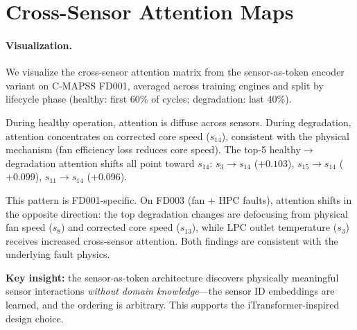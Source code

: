 \documentclass{article}
\begin{document}
\section{Cross-Sensor Attention Maps}
\label{app:attention_maps}

\paragraph{Visualization.} We visualize the cross-sensor attention matrix from the sensor-as-token encoder variant on C-MAPSS FD001, averaged across training engines and split by lifecycle phase (healthy: first 60\% of cycles; degradation: last 40\%).

During healthy operation, attention is diffuse across sensors. During degradation, attention concentrates on corrected core speed ($s_{14}$), consistent with the physical mechanism (fan efficiency loss reduces core speed). The top-5 healthy$\to$degradation attention shifts all point toward $s_{14}$: $s_3 \to s_{14}$ ($+0.103$), $s_{15} \to s_{14}$ ($+0.099$), $s_{11} \to s_{14}$ ($+0.096$).

This pattern is FD001-specific. On FD003 (fan + HPC faults), attention shifts in the opposite direction: the top degradation changes are defocusing from physical fan speed ($s_8$) and corrected core speed ($s_{13}$), while LPC outlet temperature ($s_3$) receives increased cross-sensor attention. Both findings are consistent with the underlying fault physics.

\textbf{Key insight:} the sensor-as-token architecture discovers physically meaningful sensor interactions \emph{without domain knowledge}---the sensor ID embeddings are learned, and the ordering is arbitrary. This supports the iTransformer-inspired design choice.
\end{document}
